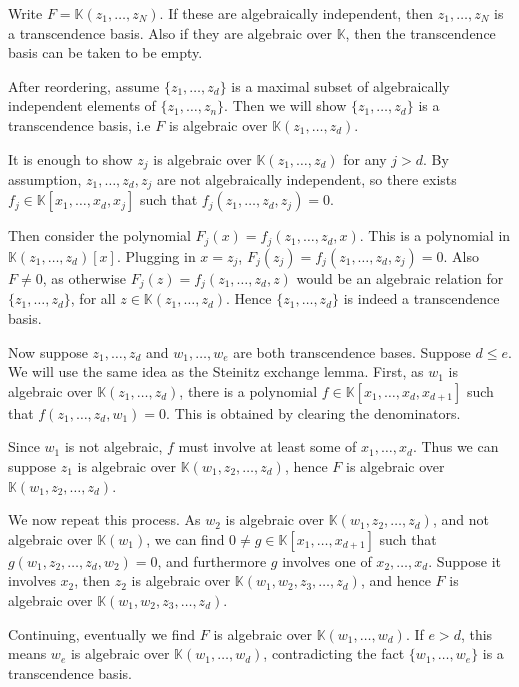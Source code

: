 \documentclass[12pt]{article}
\begin{document}
\begin{proofbox}
	Write $F = \mathbb{K}(z_1, \ldots, z_N)$. If these are algebraically independent, then $z_1, \ldots, z_N$ is a transcendence basis. Also if they are algebraic over $\mathbb{K}$, then the transcendence basis can be taken to be empty.
	
	After reordering, assume $\{z_1, \ldots, z_d\}$ is a maximal subset of algebraically independent elements of $\{z_1, \ldots, z_n\}$. Then we will show $\{z_1, \ldots, z_d\}$ is a transcendence basis, i.e $F$ is algebraic over $\mathbb{K}(z_1, \ldots, z_d)$.

	It is enough to show $z_j$ is algebraic over $\mathbb{K}(z_1, \ldots, z_d)$ for any $j > d$. By assumption, $z_1, \ldots, z_d, z_j$ are not algebraically independent, so there exists $f_j \in \mathbb{K}[x_1, \ldots, x_d, x_j]$ such that $f_j(z_1, \ldots, z_d, z_j) = 0$.

	Then consider the polynomial $F_j(x) = f_j(z_1, \ldots, z_d, x)$. This is a polynomial in $\mathbb{K}(z_1, \ldots, z_d)[x]$. Plugging in $x = z_j$, $F_j(z_j) = f_j(z_1, \ldots, z_d, z_j) = 0$. Also $F \neq 0$, as otherwise $F_j(z) = f_j(z_1, \ldots, z_d, z)$ would be an algebraic relation for $\{z_1, \ldots, z_d\}$, for all $z \in \mathbb{K}(z_1, \ldots, z_d)$. Hence $\{z_1, \ldots, z_d\}$ is indeed a transcendence basis.

	Now suppose $z_1, \ldots, z_d$ and $w_1, \ldots, w_e$ are both transcendence bases. Suppose $d \leq e$. We will use the same idea as the Steinitz exchange lemma. First, as $w_1$ is algebraic over $\mathbb{K}(z_1, \ldots, z_d)$, there is a polynomial $f \in \mathbb{K}[x_1, \ldots, x_d, x_{d+1}]$ such that $f(z_1, \ldots, z_d, w_1) = 0$. This is obtained by clearing the denominators.

	Since $w_1$ is not algebraic, $f$ must involve at least some of $x_1, \ldots, x_d$. Thus we can suppose $z_1$ is algebraic over $\mathbb{K}(w_1, z_2, \ldots, z_d)$, hence $F$ is algebraic over $\mathbb{K}(w_1, z_2, \ldots, z_d)$.

	We now repeat this process. As $w_2$ is algebraic over $\mathbb{K}(w_1, z_2, \ldots, z_d)$, and not algebraic over $\mathbb{K}(w_1)$, we can find $0 \neq g \in \mathbb{K}[x_1, \ldots, x_{d+1}]$ such that $g(w_1, z_2, \ldots, z_d, w_2) = 0$, and furthermore $g$ involves one of $x_2, \ldots, x_d$. Suppose it involves $x_2$, then $z_2$ is algebraic over $\mathbb{K}(w_1, w_2, z_3, \ldots, z_d)$, and hence $F$ is algebraic over $\mathbb{K}(w_1, w_2, z_3, \ldots, z_d)$.

	Continuing, eventually we find $F$ is algebraic over $\mathbb{K}(w_1, \ldots, w_d)$. If $e > d$, this means $w_e$ is algebraic over $\mathbb{K}(w_1, \ldots, w_d)$, contradicting the fact $\{w_1, \ldots, w_e\}$ is a transcendence basis.
\end{proofbox}
\end{document}
